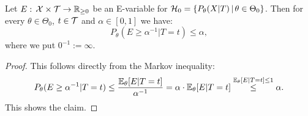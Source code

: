 \begin{Lem}
    \label{lem:e-variable-I-error}
    Let  $E:\, \mathcal{X} \times \mathcal{T} \to \mathbb{R}_{\ge0}$ be an E-variable for $\mathcal{H}_0=\left \{ P_\theta(X|T) \,\middle|\, \theta \in \Theta_0 \right \}$.
    Then for every $\theta \in \Theta_0$, $t \in \mathcal{T}$ and $\alpha \in [0,1]$ we have:
    \[  P_\theta(E \ge \alpha^{-1}|T=t) \le \alpha,   \]
    where we put $0^{-1}:=\infty$.
    \begin{proof}
        This follows directly from the Markov inequality:
        \begin{align*}
            P_\theta(E \ge \alpha^{-1}|T=t) \le \frac{\mathbb{E}_\theta[E|T=t]}{\alpha^{-1}} = \alpha \cdot \mathbb{E}_\theta[E|T=t] 
            \stackrel{\mathbb{E}_\theta[E|T=t] \le 1 }{\le} \alpha.
        \end{align*}
        This shows the claim.
    \end{proof}
\end{Lem}


